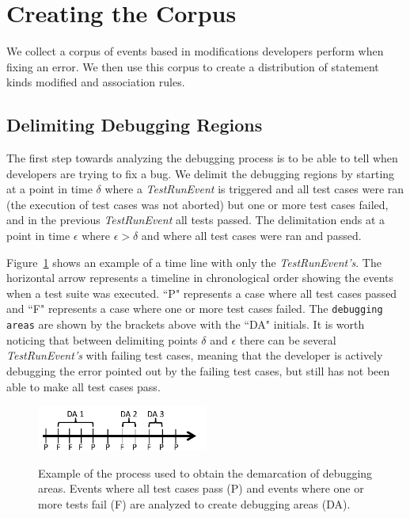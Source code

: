 \documentclass[sigconf]{acmart}
\begin{document}
\section{Creating the Corpus}
We collect a corpus of events based in modifications 
developers perform when fixing an error. We then
use this corpus to create a distribution of statement
kinds modified and association rules.

\subsection{Delimiting Debugging Regions}
\label{delimitDebugRegions}


The first step towards analyzing the debugging
process is to be able to tell when
developers are trying to fix a bug.
We delimit the debugging regions by starting at a point
in time $\delta$ where a \textit{TestRunEvent} is triggered and 
all test cases were ran (the execution of test cases
was not aborted) but one or more test cases failed, and in the 
previous \textit{TestRunEvent} all tests passed.
The delimitation ends at a point in time $\epsilon $ where $ \epsilon > \delta$ 
and where all test cases were ran and passed.

Figure~\ref{demarcations} shows an example of a time line
with only the \textit{TestRunEvent's}. The 
horizontal arrow represents a timeline in chronological order showing
the events when a test suite was executed. ``P" represents a case
where all test cases passed and ``F" represents a case where one
or more test cases failed. The \texttt{debugging areas} are shown by
the brackets above with the ``DA" initials. 
It is worth noticing
that between delimiting points $\delta$ and $\epsilon$ there can be 
several \textit{TestRunEvent's} with failing test cases, meaning
that the developer is actively debugging the error pointed out
by the failing test cases, but still has not been able to make
all test cases pass.

\begin{figure}[h]
\caption{Example of the process used to obtain the demarcation of
debugging areas. Events where all test cases pass (P) and
events where one or more tests fail (F) are analyzed to create
debugging areas (DA).}
\centering
\includegraphics[width=0.5\textwidth]{images/demarcations.png}
\label{demarcations}
\end{figure}
\end{document}

